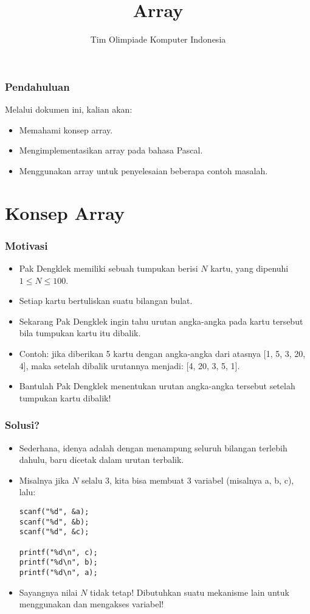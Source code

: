 

\title{Array}
\author{Tim Olimpiade Komputer Indonesia}
\date{}



\begin{frame}
\titlepage
\end{frame}

\begin{frame}
\frametitle{Pendahuluan}
Melalui dokumen ini, kalian akan:
\begin{itemize}
  \item Memahami konsep array.
  \item Mengimplementasikan array pada bahasa Pascal.
  \item Menggunakan array untuk penyelesaian beberapa contoh masalah.
\end{itemize}
\end{frame}

\section{Konsep Array}
\frame{\sectionpage}

\begin{frame}
\frametitle{Motivasi}
\begin{itemize}
  \item Pak Dengklek memiliki sebuah tumpukan berisi $N$ kartu, yang dipenuhi $1 \le N \le 100$.
  \item Setiap kartu bertuliskan suatu bilangan bulat.
  \item Sekarang Pak Dengklek ingin tahu urutan angka-angka pada kartu tersebut bila tumpukan kartu itu dibalik.
  \item Contoh: jika diberikan 5 kartu dengan angka-angka dari atasnya [1, 5, 3, 20, 4], maka setelah dibalik urutannya menjadi: [4, 20, 3, 5, 1].
  \item Bantulah Pak Dengklek menentukan urutan angka-angka tersebut setelah tumpukan kartu dibalik!
\end{itemize}
\end{frame}

\begin{frame}[fragile]
\frametitle{Solusi?}
\begin{itemize}
  \item Sederhana, idenya adalah dengan menampung seluruh bilangan terlebih dahulu, baru dicetak dalam urutan terbalik.
  \item Misalnya jika $N$ selalu 3, kita bisa membuat 3 variabel (misalnya a, b, c), lalu:
\begin{lstlisting}
scanf("%d", &a);
scanf("%d", &b);
scanf("%d", &c);

printf("%d\n", c);
printf("%d\n", b);
printf("%d\n", a);
\end{lstlisting}
  \item Sayangnya nilai $N$ tidak tetap! Dibutuhkan suatu mekanisme lain untuk menggunakan dan mengakses variabel!
\end{itemize}
\end{frame}

